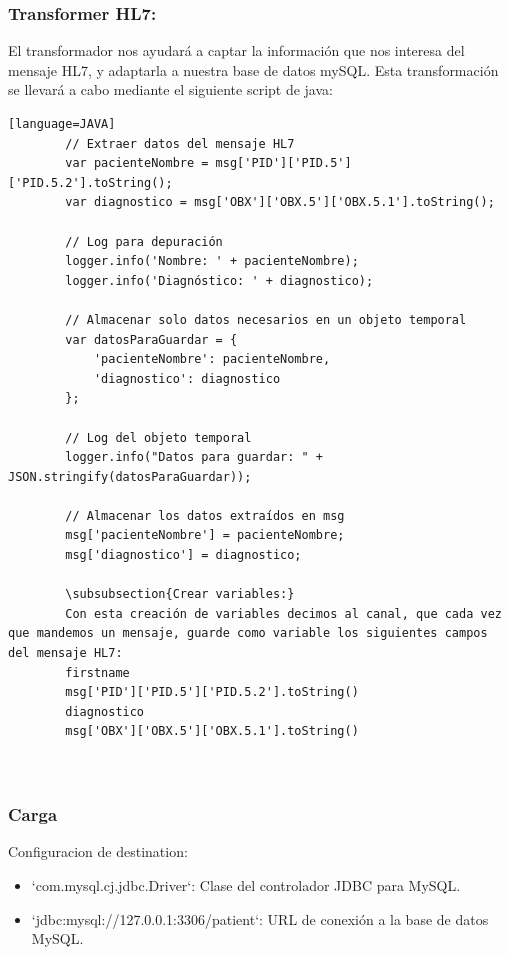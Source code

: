\documentclass[12pt, a4paper, twoside]{article}
\begin{document}
	\subsubsection{Transformer HL7:}
	El transformador nos ayudará a captar la información que nos interesa del mensaje HL7, y adaptarla a nuestra base de datos mySQL. Esta transformación se llevará a cabo mediante el siguiente script de java:
	\begin{verbatim}[language=JAVA]
		// Extraer datos del mensaje HL7
		var pacienteNombre = msg['PID']['PID.5']['PID.5.2'].toString(); 
		var diagnostico = msg['OBX']['OBX.5']['OBX.5.1'].toString();
		
		// Log para depuración
		logger.info('Nombre: ' + pacienteNombre);
		logger.info('Diagnóstico: ' + diagnostico);
		
		// Almacenar solo datos necesarios en un objeto temporal
		var datosParaGuardar = {
			'pacienteNombre': pacienteNombre,
			'diagnostico': diagnostico
		};
		
		// Log del objeto temporal
		logger.info("Datos para guardar: " + JSON.stringify(datosParaGuardar));
		
		// Almacenar los datos extraídos en msg
		msg['pacienteNombre'] = pacienteNombre;
		msg['diagnostico'] = diagnostico;
		
		\subsubsection{Crear variables:}
		Con esta creación de variables decimos al canal, que cada vez que mandemos un mensaje, guarde como variable los siguientes campos del mensaje HL7:
		firstname
		msg['PID']['PID.5']['PID.5.2'].toString()
		diagnostico
		msg['OBX']['OBX.5']['OBX.5.1'].toString()
		
		
	\end{verbatim}
	
	\subsubsection{Carga}
	
	Configuracion de destination:
	\begin{itemize}
		\item `com.mysql.cj.jdbc.Driver`: Clase del controlador JDBC para MySQL.
		\item `jdbc:mysql://127.0.0.1:3306/patient`: URL de conexión a la base de datos MySQL.
	\end{itemize}
	
\end{document}
